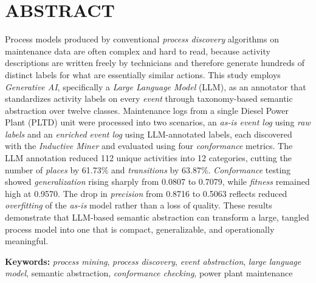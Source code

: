 \chapter*{ABSTRACT}

{\fontsize{11}{13.2}\selectfont
Process models produced by conventional \textit{process discovery} algorithms on maintenance data are often complex and hard to read, because activity descriptions are written freely by technicians and therefore generate hundreds of distinct labels for what are essentially similar actions. This study employs \textit{Generative AI}, specifically a \textit{Large Language Model} (LLM), as an annotator that standardizes activity labels on every \textit{event} through taxonomy-based semantic abstraction over twelve classes. Maintenance logs from a single Diesel Power Plant (PLTD) unit were processed into two scenarios, an \textit{as-is event log} using \textit{raw labels} and an \textit{enriched event log} using LLM-annotated labels, each discovered with the \textit{Inductive Miner} and evaluated using four \textit{conformance} metrics. The LLM annotation reduced 112 unique activities into 12 categories, cutting the number of \textit{places} by 61.73\% and \textit{transitions} by 63.87\%. \textit{Conformance} testing showed \textit{generalization} rising sharply from 0.0807 to 0.7079, while \textit{fitness} remained high at 0.9570. The drop in \textit{precision} from 0.8716 to 0.5063 reflects reduced \textit{overfitting} of the \textit{as-is} model rather than a loss of quality. These results demonstrate that LLM-based semantic abstraction can transform a large, tangled process model into one that is compact, generalizable, and operationally meaningful.

\vspace{1cm}

\noindent\textbf{Keywords:} \textit{process mining}, \textit{process discovery}, \textit{event abstraction}, \textit{large language model}, semantic abstraction, \textit{conformance checking}, power plant maintenance
}
